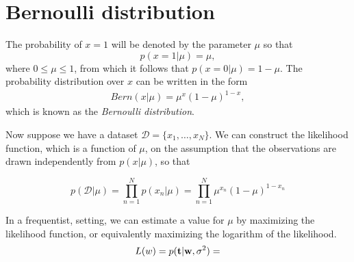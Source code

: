 \section{Bernoulli distribution}
\label{sec:bernoulli}

The probability of $x=1$ will be denoted by the parameter $\mu$ so that 
$$p(x=1|\mu) = \mu,$$
where $0 \leq \mu \leq 1$, from which it follows that $p(x=0|\mu) = 1-\mu$. The probability distribution over $x$ can be written in the form 
\begin{align}
	Bern(x|\mu) = \mu^x(1-\mu)^{1-x},
	\label{eq:bernoulli}
\end{align}
which is known as the \textit{Bernoulli distribution}.  

Now suppose we have a dataset $\mathcal{D} = \{x_1, \dots, x_{N}\}$. We can construct the likelihood function, which is a function of $\mu$, on the assumption that the observations are drawn independently from $p(x|\mu)$, so that

$$p(\mathcal{D}|\mu) = \prod_{n=1}^Np(x_n|\mu)= \prod_{n=1}^N\mu^{x_n}(1-\mu)^{1-x_n}$$

In a frequentist, setting, we can estimate a value for $\mu$ by maximizing the likelihood function, or equivalently maximizing the logarithm of the likelihood. 
$$L(w) = p({\mathbf{t}}|{\mathbf{w}}, \sigma^2) = $$



